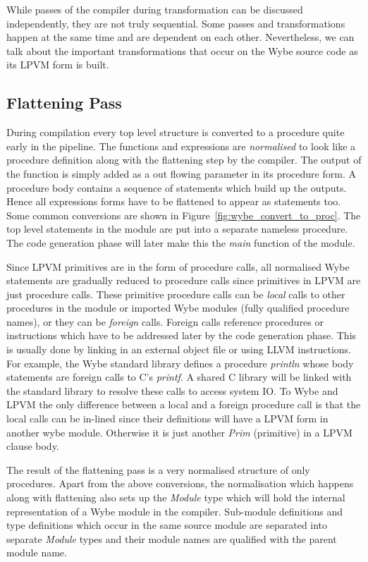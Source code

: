 While passes of the compiler during transformation can be discussed
independently, they are not truly sequential. Some passes and transformations
happen at the same time and are dependent on each other. Nevertheless, we can
talk about the important transformations that occur on the Wybe source code as
its LPVM form is built.

\subsection{Flattening Pass}

During compilation every top level structure is converted to a procedure quite
early in the pipeline. The functions and expressions are \textit{normalised} to
look like a procedure definition along with the flattening step by the
compiler. The output of the function is simply added as a out flowing parameter
in its procedure form. A procedure body contains a sequence of statements which
build up the outputs. Hence all expressions forms have to be flattened to
appear as statements too. Some common conversions are shown in
Figure~\ref{fig:wybe_convert_to_proc}. The top level statements in the module
are put into a separate nameless procedure. The code generation phase will
later make this the \textit{main} function of the module.

Since LPVM primitives are in the form of procedure calls, all normalised Wybe
statements are gradually reduced to procedure calls since primitives in LPVM
are just procedure calls. These primitive procedure calls can be \textit{local}
calls to other procedures in the module or imported Wybe modules (fully
qualified procedure names), or they can be \textit{foreign} calls. Foreign
calls reference procedures or instructions which have to be addressed later by
the code generation phase. This is usually done by linking in an external
object file or using LLVM instructions. For example, the Wybe standard library
defines a procedure \textit{println} whose body statements are foreign calls to
C's \textit{printf}. A shared C library will be linked with the standard
library to resolve these calls to access system IO. To Wybe and LPVM the only
difference between a local and a foreign procedure call is that the local calls
can be in-lined since their definitions will have a LPVM form in another wybe
module. Otherwise it is just another \textit{Prim} (primitive) in a LPVM clause
body.

The result of the flattening pass is a very normalised structure of only
procedures. Apart from the above conversions, the normalisation which happens
along with flattening also sets up the \textit{Module} type which will hold the
internal representation of a Wybe module in the compiler. Sub-module
definitions and type definitions which occur in the same source module are
separated into separate \textit{Module} types and their module names are
qualified with the parent module name.

